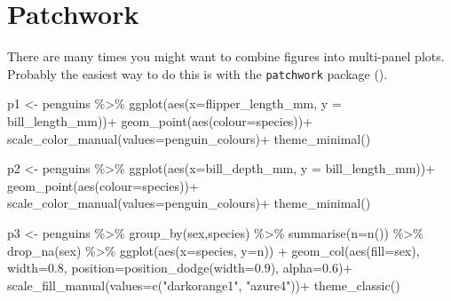 \documentclass[
]{book}
\newenvironment{Shaded}{\begin{snugshade}}{\end{snugshade}}
\newcommand{\AttributeTok}[1]{\textcolor[rgb]{0.77,0.63,0.00}{#1}}
\newcommand{\FloatTok}[1]{\textcolor[rgb]{0.00,0.00,0.81}{#1}}
\newcommand{\FunctionTok}[1]{\textcolor[rgb]{0.00,0.00,0.00}{#1}}
\newcommand{\NormalTok}[1]{#1}
\newcommand{\OtherTok}[1]{\textcolor[rgb]{0.56,0.35,0.01}{#1}}
\newcommand{\SpecialCharTok}[1]{\textcolor[rgb]{0.00,0.00,0.00}{#1}}
\newcommand{\StringTok}[1]{\textcolor[rgb]{0.31,0.60,0.02}{#1}}
\begin{document}
\hypertarget{patchwork}{%
\section{Patchwork}\label{patchwork}}

There are many times you might want to combine figures into multi-panel plots. Probably the easiest way to do this is with the \texttt{patchwork} package (\citet{R-patchwork}).

\begin{Shaded}
\begin{Highlighting}[]
\NormalTok{p1 }\OtherTok{\textless{}{-}}\NormalTok{ penguins }\SpecialCharTok{\%\textgreater{}\%} 
  \FunctionTok{ggplot}\NormalTok{(}\FunctionTok{aes}\NormalTok{(}\AttributeTok{x=}\NormalTok{flipper\_length\_mm, }
             \AttributeTok{y =}\NormalTok{ bill\_length\_mm))}\SpecialCharTok{+}
  \FunctionTok{geom\_point}\NormalTok{(}\FunctionTok{aes}\NormalTok{(}\AttributeTok{colour=}\NormalTok{species))}\SpecialCharTok{+}
  \FunctionTok{scale\_color\_manual}\NormalTok{(}\AttributeTok{values=}\NormalTok{penguin\_colours)}\SpecialCharTok{+}
  \FunctionTok{theme\_minimal}\NormalTok{()}

\NormalTok{p2 }\OtherTok{\textless{}{-}}\NormalTok{ penguins }\SpecialCharTok{\%\textgreater{}\%} 
  \FunctionTok{ggplot}\NormalTok{(}\FunctionTok{aes}\NormalTok{(}\AttributeTok{x=}\NormalTok{bill\_depth\_mm, }
             \AttributeTok{y =}\NormalTok{ bill\_length\_mm))}\SpecialCharTok{+}
  \FunctionTok{geom\_point}\NormalTok{(}\FunctionTok{aes}\NormalTok{(}\AttributeTok{colour=}\NormalTok{species))}\SpecialCharTok{+}
  \FunctionTok{scale\_color\_manual}\NormalTok{(}\AttributeTok{values=}\NormalTok{penguin\_colours)}\SpecialCharTok{+}
  \FunctionTok{theme\_minimal}\NormalTok{()}

\NormalTok{p3 }\OtherTok{\textless{}{-}}\NormalTok{ penguins }\SpecialCharTok{\%\textgreater{}\%}     
  \FunctionTok{group\_by}\NormalTok{(sex,species) }\SpecialCharTok{\%\textgreater{}\%} 
    \FunctionTok{summarise}\NormalTok{(}\AttributeTok{n=}\FunctionTok{n}\NormalTok{()) }\SpecialCharTok{\%\textgreater{}\%} 
     \FunctionTok{drop\_na}\NormalTok{(sex) }\SpecialCharTok{\%\textgreater{}\%} 
     \FunctionTok{ggplot}\NormalTok{(}\FunctionTok{aes}\NormalTok{(}\AttributeTok{x=}\NormalTok{species, }\AttributeTok{y=}\NormalTok{n)) }\SpecialCharTok{+} 
  \FunctionTok{geom\_col}\NormalTok{(}\FunctionTok{aes}\NormalTok{(}\AttributeTok{fill=}\NormalTok{sex), }
               \AttributeTok{width=}\FloatTok{0.8}\NormalTok{,}
               \AttributeTok{position=}\FunctionTok{position\_dodge}\NormalTok{(}\AttributeTok{width=}\FloatTok{0.9}\NormalTok{), }
               \AttributeTok{alpha=}\FloatTok{0.6}\NormalTok{)}\SpecialCharTok{+}
     \FunctionTok{scale\_fill\_manual}\NormalTok{(}\AttributeTok{values=}\FunctionTok{c}\NormalTok{(}\StringTok{"darkorange1"}\NormalTok{, }\StringTok{"azure4"}\NormalTok{))}\SpecialCharTok{+}
     \FunctionTok{theme\_classic}\NormalTok{()}


\end{Highlighting}
\end{Shaded}
\end{document}
